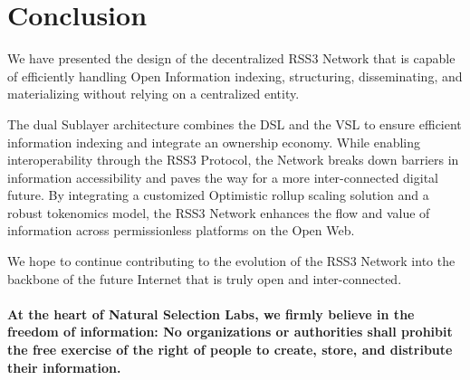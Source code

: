 \section{Conclusion} 
We have presented the design of the decentralized RSS3 Network that is capable of efficiently handling Open Information indexing, structuring, disseminating, and materializing without relying on a centralized entity.

The dual Sublayer architecture combines the \gls{DSL} and the \gls{VSL} to ensure efficient information indexing and integrate an ownership economy.
While enabling interoperability through the RSS3 Protocol, the Network breaks down barriers in information accessibility and paves the way for a more inter-connected digital future. 
By integrating a customized Optimistic rollup scaling solution and a robust tokenomics model, the RSS3 Network enhances the flow and value of information across permissionless platforms on the Open Web.

We hope to continue contributing to the evolution of the RSS3 Network into the backbone of the future Internet that is truly open and inter-connected.
\\
\\
\textbf{At the heart of Natural Selection Labs, we firmly believe in the freedom of information: No organizations or authorities shall prohibit the free exercise of the right of people to create, store, and distribute their information.}